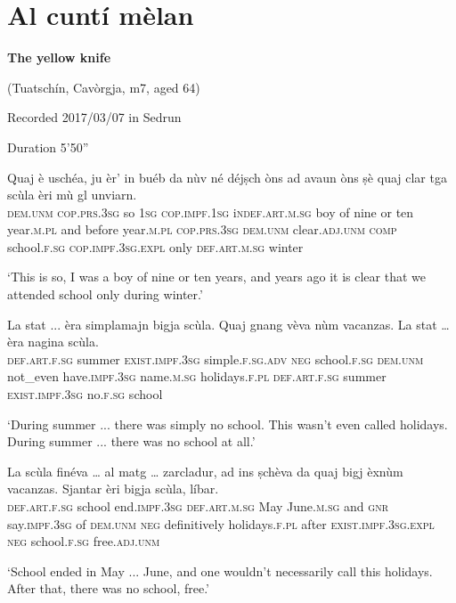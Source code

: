 \section{Al cuntí mèlan}

\noindent
\textbf{The yellow knife}

\noindent
(Tuatschín, Cavòrgja, m7, aged 64)

\noindent
Recorded 2017/03/07 in Sedrun

\noindent
Duration 5'50''

\bigskip

\begin{linenumbers}
	\gll Quaj è uschéa, ju èr’ in buéb da nùv né déjṣch òns ad avaun òns ṣè quaj clar tga scùla èri mù gl unviarn.   \\
	\textsc{dem.unm} \textsc{cop.prs.3sg} so \textsc{1sg} \textsc{cop.impf.1sg} i\textsc{ndef.art.m.sg} boy of nine or ten year.\textsc{m.pl} and before year\textsc{.m.pl} \textsc{cop.prs.3sg} \textsc{dem.unm} clear.\textsc{adj.unm} \textsc{comp} school.\textsc{f.sg} \textsc{cop.impf.3sg.expl} only \textsc{def.art.m.sg} winter\\
\end{linenumbers}
\medskip
\glt `This is so, I was a boy of nine or ten years, and years ago it is clear that we attended school only during winter.'
\medskip

\begin{linenumbers}
	\gll  La stat ... èra simplamajn bigja scùla. Quaj gnang vèva nùm vacanzas. La stat … èra nagina scùla.  \\
\textsc{def.art.f.sg} summer {} \textsc{exist.impf.3sg} simple.\textsc{f.sg.adv} \textsc{neg} school.\textsc{f.sg} \textsc{dem.unm} not\_even have.\textsc{impf.3sg} name.\textsc{m.sg} holidays.\textsc{f.pl} \textsc{def.art.f.sg} summer {} \textsc{exist.impf.3sg} no.\textsc{f.sg} school \\
\end{linenumbers}
\medskip
\glt `During summer ... there was simply no school. This wasn't even called holidays. During summer ... there was no school at all.'
\medskip

\begin{linenumbers}
	\gll  La scùla finéva … al matg … zarcladur, ad ins ṣchèva da quaj bigj èxnùm vacanzas. Sjantar èri bigja scùla, líbar.  \\
	\textsc{def.art.f.sg} school end.\textsc{impf.3sg} {} \textsc{def.art.m.sg} May {} June.\textsc{m.sg} and \textsc{gnr} say.\textsc{impf.3sg} of \textsc{dem.unm} \textsc{neg} definitively holidays.\textsc{f.pl} after \textsc{exist.impf.3sg.expl} \textsc{neg} school.\textsc{f.sg} free.\textsc{adj.unm}    \\
\end{linenumbers}
\medskip
\glt `School ended in May ... June, and one wouldn't necessarily call this holidays. After that, there was no school, free.'
\medskip

